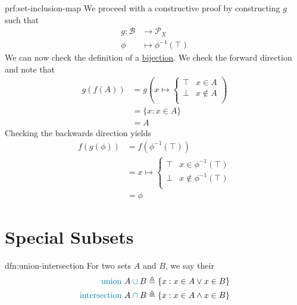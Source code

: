 \begin{prf}{prf:set-inclusion-map}
    We proceed with a constructive proof by constructing \( g \) such that
    \begin{align*}
        g : \mathcal{B} &\to \mathcal{P}_{X} \\
        \phi &\mapsto \phi^{-1}(\top)
    \end{align*}
    We can now check the definition of a \hyperref[dfn:bijection]{bijection}.
    We check the forward direction and note that
    \begin{align*}
        g(f(A)) &= g
        \left(
            x \mapsto
            \begin{cases}
                \top & x \in A \\
                \bot & x \notin A \\
            \end{cases}
        \right) \\
        &= \{ x : x \in A \} \\
        &= A
    \end{align*}
    Checking the backwards direction yields
    \begin{align*}
        f(g(\phi)) &= f\left( \phi^{-1}(\top) \right) \\
        &= x \mapsto
            \begin{cases}
                \top & x \in \phi^{-1}(\top) \\
                \bot & x \notin \phi^{-1}(\top) \\
            \end{cases} \\
        &= \phi
    \end{align*}
\end{prf}
\newpage
\section{Special Subsets}\label{sec:subsets}

\begin{dfn}{dfn:union-intersection}
    For two sets \( A \) and \( B \), we say their
    \begin{align*}
        \text{\textcolor{dfn-color}{union} } & A \mathbin{\textcolor{dfn-color}{\cup}} B \triangleq \{ x : x \in A \lor x \in B \} \\
        \text{\textcolor{dfn-color}{intersection} } & A \mathbin{\textcolor{dfn-color}{\cap}} B \triangleq \{ x : x \in A \land x \in B \}
    \end{align*}
\end{dfn}


